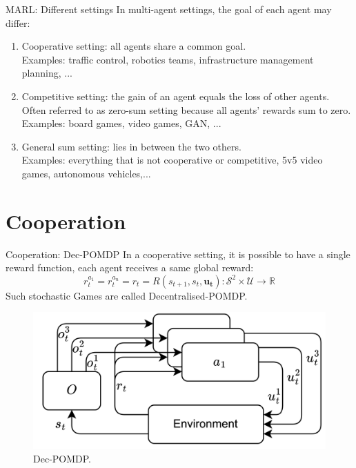 \documentclass[9pt, hyperref={pdfusetitle,colorlinks=true,allcolors=DarkBlue}]{beamer}
\begin{document}
\begin{frame}{MARL: Different settings}
In multi-agent settings, the goal of each agent may differ:
\vfill
\begin{enumerate}
    \item Cooperative setting: all agents share a common goal.
    \\Examples: traffic control, robotics teams, infrastructure management planning, ...
    \vfill
    \item Competitive setting: the gain of an agent equals the loss of other agents.
    \\Often referred to as zero-sum setting because all agents' rewards sum to zero.
    \\Examples: board games, video games, GAN, ...
    \vfill
    \item General sum setting: lies in between the two others.
    \\Examples: everything that is not cooperative or competitive, 5v5 video games, autonomous vehicles,...
\end{enumerate}
\end{frame}

\section{Cooperation}

\begin{frame}{Cooperation: Dec-POMDP}
In a cooperative setting, it is possible to have a single reward function, each agent receives a same global reward:
\begin{equation*}
    r^{a_1}_t = r^{a_n}_t=r_t = R(s_{t+1}, s_t, \boldsymbol{u_t}): \mathcal{S}^2 \times \mathcal{U} \rightarrow \mathbb{R}
\end{equation*}
Such stochastic Games are called Decentralised-POMDP.
\begin{figure}
    \centering
    \includegraphics[width=\linewidth]{decpomdp.png}
    \caption{Dec-POMDP.}

\end{figure}
\end{frame}
\end{document}
